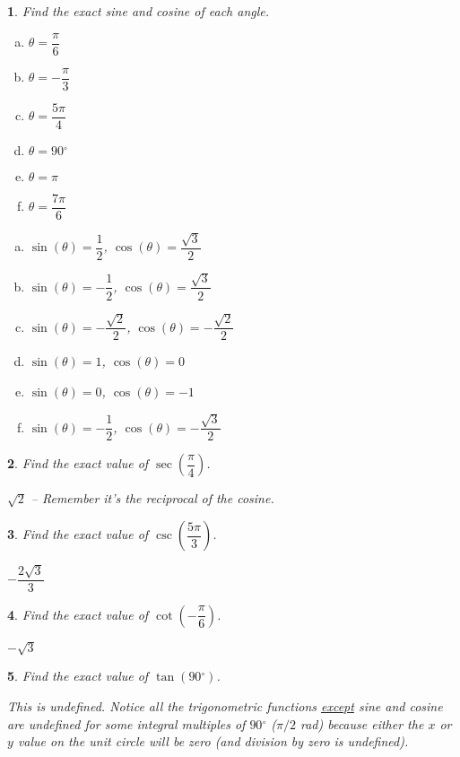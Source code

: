 \documentclass{amsbook}
\newcommand{\ssp}{\begin{enumerate}[(a), leftmargin=*]}
\newcommand{\esp}{\end{enumerate}}
\newtheorem{exc}{}
\newenvironment{ex}{\begin{exc}\normalfont}{\end{exc}}
\numberwithin{section}{chapter}
\numberwithin{equation}{chapter}
\newcommand{\dg}{{^\circ}}
\begin{document}
\begin{ex}
	Find the exact sine and cosine of each angle.
	\begin{multicols}{2}
		\ssp
		\item $\theta = \dfrac{\pi}{6}$
		\item $\theta = -\dfrac{\pi}{3}$
		\item $\theta = \dfrac{5\pi}{4}$
		\item $\theta = 90\dg$
		\item $\theta = \pi$
		\item $\theta = \dfrac{7\pi}{6}$
		\esp
	\end{multicols}
	
	\begin{sol}
		\ssp
		\item $\sin(\theta) = \dfrac{1}{2}$, $\cos(\theta) = \dfrac{\sqrt{3}}{2}$
		\item $\sin(\theta) = -\dfrac{1}{2}$, $\cos(\theta) = \dfrac{\sqrt{3}}{2}$
		\item $\sin(\theta) = -\dfrac{\sqrt{2}}{2}$, $\cos(\theta) = -\dfrac{\sqrt{2}}{2}$
		\item $\sin(\theta) = 1$, $\cos(\theta) = 0$
		\item $\sin(\theta) = 0$, $\cos(\theta) = -1$
		\item $\sin(\theta) = -\dfrac{1}{2}$, $\cos(\theta) = -\dfrac{\sqrt{3}}{2}$
		\esp
	\end{sol}
\end{ex}

\begin{ex}
	Find the exact value of $\sec\left( \dfrac{\pi}{4}\right)$.
	\begin{sol}
		$\sqrt{2}$ -- Remember it's the reciprocal of the cosine.
	\end{sol}
\end{ex}


\begin{ex}
	Find the exact value of $\csc\left( \dfrac{5\pi}{3}\right)$.
	\begin{sol}
		$-\dfrac{2\sqrt{3}}{3}$
	\end{sol}
\end{ex}


\begin{ex}
	Find the exact value of $\cot\left( -\dfrac{\pi}{6}\right)$.
	\begin{sol}
		$-\sqrt{3}$
	\end{sol}
\end{ex}


\begin{ex}
	Find the exact value of $\tan\left( 90\dg\right)$.
	\begin{sol}
		This is undefined. Notice all the trigonometric functions \underline{except} sine and cosine are undefined for some integral multiples of $90\dg$ ($\pi/2$ rad) because either the $x$ or $y$ value on the unit circle will be zero (and division by zero is undefined).
	\end{sol}
\end{ex}
\end{document}
